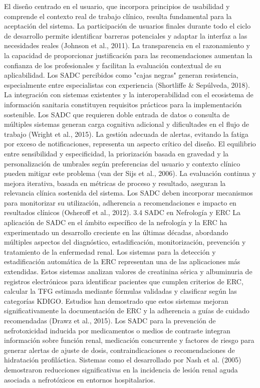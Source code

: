 \documentclass{article}
\begin{document}
\begin{multicols}{2}
El diseño centrado en el usuario, que incorpora principios de usabilidad y comprende el contexto real de trabajo clínico, resulta fundamental para la aceptación del sistema. La participación de usuarios finales durante todo el ciclo de desarrollo permite identificar barreras potenciales y adaptar la interfaz a las necesidades reales (Johnson et al., 2011).
La transparencia en el razonamiento y la capacidad de proporcionar justificación para las recomendaciones aumentan la confianza de los profesionales y facilitan la evaluación contextual de su aplicabilidad. Los SADC percibidos como "cajas negras" generan resistencia, especialmente entre especialistas con experiencia (Shortliffe \& Sepúlveda, 2018).
La integración con sistemas existentes y la interoperabilidad con el ecosistema de información sanitaria constituyen requisitos prácticos para la implementación sostenible. Los SADC que requieren doble entrada de datos o consulta de múltiples sistemas generan carga cognitiva adicional y dificultades en el flujo de trabajo (Wright et al., 2015).
La gestión adecuada de alertas, evitando la fatiga por exceso de notificaciones, representa un aspecto crítico del diseño. El equilibrio entre sensibilidad y especificidad, la priorización basada en gravedad y la personalización de umbrales según preferencias del usuario y contexto clínico pueden mitigar este problema (van der Sijs et al., 2006).
La evaluación continua y mejora iterativa, basada en métricas de proceso y resultado, aseguran la relevancia clínica sostenida del sistema. Los SADC deben incorporar mecanismos para monitorizar su utilización, adherencia a recomendaciones e impacto en resultados clínicos (Osheroff et al., 2012).
 3.4 SADC en Nefrología y ERC
La aplicación de SADC en el ámbito específico de la nefrología y la ERC ha experimentado un desarrollo creciente en las últimas décadas, abordando múltiples aspectos del diagnóstico, estadificación, monitorización, prevención y tratamiento de la enfermedad renal.
Los sistemas para la detección y estadificación automática de la ERC representan una de las aplicaciones más extendidas. Estos sistemas analizan valores de creatinina sérica y albuminuria de registros electrónicos para identificar pacientes que cumplen criterios de ERC, calcular la TFG estimada mediante fórmulas validadas y clasificar según las categorías KDIGO. Estudios han demostrado que estos sistemas mejoran significativamente la documentación de ERC y la adherencia a guías de cuidado recomendadas (Drawz et al., 2015).
Los SADC para la prevención de nefrotoxicidad inducida por medicamentos o medios de contraste integran información sobre función renal, medicación concurrente y factores de riesgo para generar alertas de ajuste de dosis, contraindicaciones o recomendaciones de hidratación profiláctica. Sistemas como el desarrollado por Nash et al. (2005) demostraron reducciones significativas en la incidencia de lesión renal aguda asociada a nefrotóxicos en entornos hospitalarios.

\end{multicols}
\end{document}
